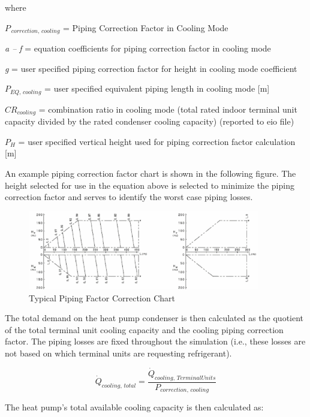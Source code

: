 where

\({P_{\,correction,\,cooling}}\) = Piping Correction Factor in Cooling Mode

\emph{a -- f} = equation coefficients for piping correction factor in cooling mode

\emph{g} = user specified piping correction factor for height in cooling mode coefficient

\(P_{EQ,\,cooling}\) = user specified equivalent piping length in cooling mode [m]

\(CR_{cooling}\) = combination ratio in cooling mode (total rated indoor terminal unit capacity divided by the rated condenser cooling capacity) (reported to eio file)

\(P_H\) = user specified vertical height used for piping correction factor calculation [m]

An example piping correction factor chart is shown in the following figure. The height selected for use in the equation above is selected to minimize the piping correction factor and serves to identify the worst case piping losses.

\begin{figure}[hbtp] %
\centering
\includegraphics[width=0.9\textwidth, height=0.9\textheight, keepaspectratio=true]{media/image5358.png}
\caption{Typical Piping Factor Correction Chart \label{fig:typical-piping-factor-correction-chart}}
\end{figure}

The total demand on the heat pump condenser is then calculated as the quotient of the total terminal unit cooling capacity and the cooling piping correction factor. The piping losses are fixed throughout the simulation (i.e., these losses are not based on which terminal units are requesting refrigerant).

\begin{equation}
  \dot{Q}_{cooling,\,total} = \frac{\dot{Q}_{cooling,\,TerminalUnits}}{P_{correction,\,cooling}}
\end{equation}

The heat pump's total available cooling capacity is then calculated as:

